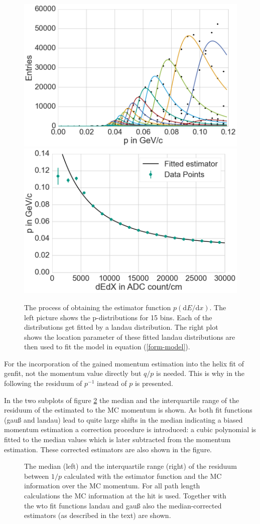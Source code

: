 \begin{figure}
  \centering
  \includegraphics[width=0.48\linewidth]{figures/vxd/fitLandau1.png}
  \includegraphics[width=0.48\linewidth]{figures/vxd/fitLandau2.png}
  \caption[The process of obtaining the estimator function $p(\mathrm d E/\mathrm d x)$.]{The process of obtaining the estimator function $p(\mathrm d E/\mathrm d x)$. The left picture shows the p-distributions for 15 \dedx bins. Each of the distributions get fitted by a landau distribution. The right plot shows the location parameter of these fitted landau distributions are then used to fit the model in equation (\ref{form-model}).}
  \label{fig-fit-bins}
\end{figure}

For the incorporation of the gained momentum estimation into the helix fit of genfit, not the momentum value directly but $q/p$ is needed. This is why in the following the residuum of $p^{-1}$ instead of $p$ is presented.

In the two subplots of figure \ref{fig-divp-residuum} the median and the interquartile range of the residuum of the estimated to the MC momentum is shown. As both fit functions (gauß and landau) lead to quite large shifts in the median indicating a biased momentum estimation a correction procedure is introduced: a cubic polynomial is fitted to the median values which is later subtracted from the momentum estimation. These corrected estimators are also shown in the figure.

\begin{figure}
  \centering
  \caption[Median and IQR of $1/p$.]{The median (left) and the interquartile range (right) of the residuum between $1/p$ calculated with the estimator function and the MC information over the MC momentum. For all path length calculations the MC information at the hit is used. Together with the wto fit functions landau and gauß also the median-corrected estimators (as described in the text) are shown.}
  \label{fig-divp-residuum}
\end{figure}


